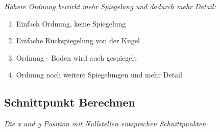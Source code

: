 \textit{Höhere Ordnung bewirkt mehr Spiegelung und dadurch mehr Detail:}

\begin{enumerate}
    \item Einfach Ordnung, keine Spiegelung
    \item Einfache Rückspiegelung von der Kugel
    \item Ordnung - Boden wird auch gespiegelt
    \item Ordnung noch weitere Spiegelungen und mehr Detail
\end{enumerate}

\subsection{Schnittpunkt Berechnen}

\textit{Die x und y Position mit Nullstellen entsprechen Schnittpunkten}
